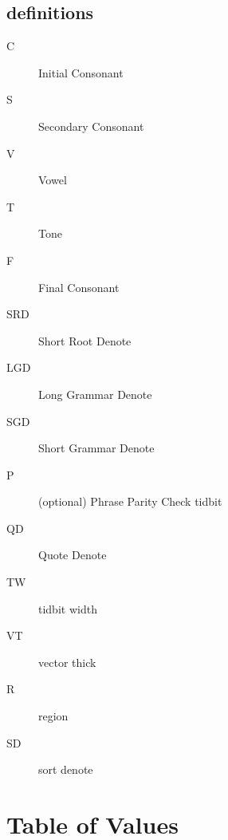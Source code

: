 \documentclass[12pt]{report}
\begin{document}
\subsection{definitions}
\begin{description}
  \item [C] Initial Consonant
  \item [S] Secondary Consonant
  \item [V] Vowel
  \item [T] Tone
  \item [F] Final Consonant
  \item [SRD] Short Root Denote
  \item [LGD] Long Grammar Denote
  \item [SGD] Short Grammar Denote
  \item [P] (optional) Phrase Parity Check tidbit
  \item [QD] Quote Denote
  \item [TW] tidbit width
  \item [VT] vector thick
  \item [R] region
  \item [SD] sort denote
\end{description}

\section{Table of Values}\label{values}
\end{document}
